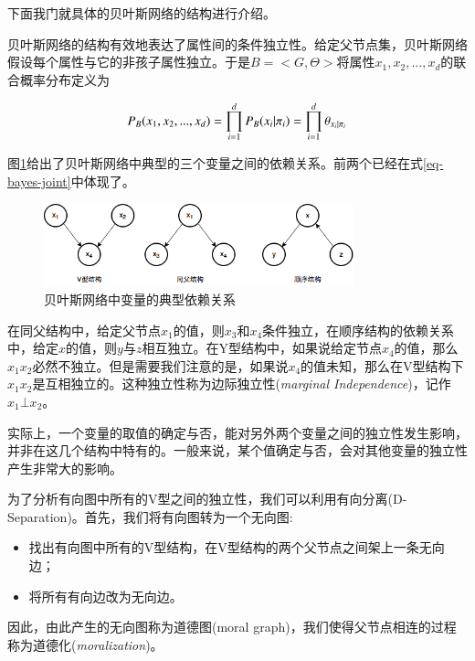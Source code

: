 下面我门就具体的贝叶斯网络的结构进行介绍。

贝叶斯网络的结构有效地表达了属性间的条件独立性。给定父节点集，贝叶斯网络假设每个属性与它的非孩子属性独立。于是$B = <G,\Theta>$将属性$x_1,x_2,...,x_d$的联合概率分布定义为

\begin{equation}
P_B(x_1,x_2,...,x_d) = \prod_{i=1}^{d} P_B(x_i | \pi_i) = \prod_{i=1}^{d}\theta_{x_i|\pi_i}\\
\label{eq-bayes-joint}
\end{equation}

图\ref{fig-bayes-dependence}给出了贝叶斯网络中典型的三个变量之间的依赖关系。前两个已经在式\ref{eq-bayes-joint}中体现了。




\begin{figure}[ht]
    \centering
    \includegraphics[scale=1, width=0.8\textwidth]{figure/BNrelation.png}
    \caption{贝叶斯网络中变量的典型依赖关系}
    \label{fig-bayes-dependence}
\end{figure}


在同父结构中，给定父节点$x_1$的值，则$x_3$和$x_4$条件独立，在顺序结构的依赖关系中，给定$x$的值，则$y$与$z$相互独立。在Y型结构中，如果说给定节点$x_4$的值，那么$x_1$$x_2$必然不独立。但是需要我们注意的是，如果说$x_4$的值未知，那么在V型结构下$x_1$$x_2$是互相独立的。这种独立性称为边际独立性(\textit{marginal Independence})，记作$x_1 \bot x_2$。

实际上，一个变量的取值的确定与否，能对另外两个变量之间的独立性发生影响，并非在这几个结构中特有的。一般来说，某个值确定与否，会对其他变量的独立性产生非常大的影响。

为了分析有向图中所有的V型之间的独立性，我们可以利用有向分离(D-Separation)。首先，我们将有向图转为一个无向图:

\begin{itemize}
	\item 找出有向图中所有的V型结构，在V型结构的两个父节点之间架上一条无向边；
	\item 将所有有向边改为无向边。
\end{itemize}

因此，由此产生的无向图称为道德图(moral graph)，我们使得父节点相连的过程称为道德化(\textit{moralization})。

